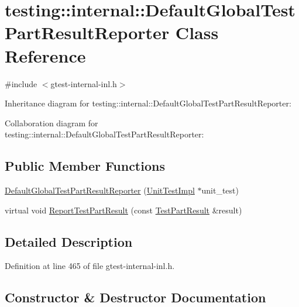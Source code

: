 \hypertarget{classtesting_1_1internal_1_1_default_global_test_part_result_reporter}{}\section{testing\+:\+:internal\+:\+:Default\+Global\+Test\+Part\+Result\+Reporter Class Reference}
\label{classtesting_1_1internal_1_1_default_global_test_part_result_reporter}


{\ttfamily \#include $<$gtest-\/internal-\/inl.\+h$>$}



Inheritance diagram for testing\+:\+:internal\+:\+:Default\+Global\+Test\+Part\+Result\+Reporter\+:


Collaboration diagram for testing\+:\+:internal\+:\+:Default\+Global\+Test\+Part\+Result\+Reporter\+:
\subsection*{Public Member Functions}
\begin{DoxyCompactItemize}
\item 
\hyperlink{classtesting_1_1internal_1_1_default_global_test_part_result_reporter_a3900ea7f34b34afd48c7d1d0312a1488}{Default\+Global\+Test\+Part\+Result\+Reporter} (\hyperlink{classtesting_1_1internal_1_1_unit_test_impl}{Unit\+Test\+Impl} $\ast$unit\+\_\+test)
\item 
virtual void \hyperlink{classtesting_1_1internal_1_1_default_global_test_part_result_reporter_a6081576a23b964cfecab1e424d8044fc}{Report\+Test\+Part\+Result} (const \hyperlink{classtesting_1_1_test_part_result}{Test\+Part\+Result} \&result)
\end{DoxyCompactItemize}


\subsection{Detailed Description}


Definition at line 465 of file gtest-\/internal-\/inl.\+h.



\subsection{Constructor \& Destructor Documentation}
